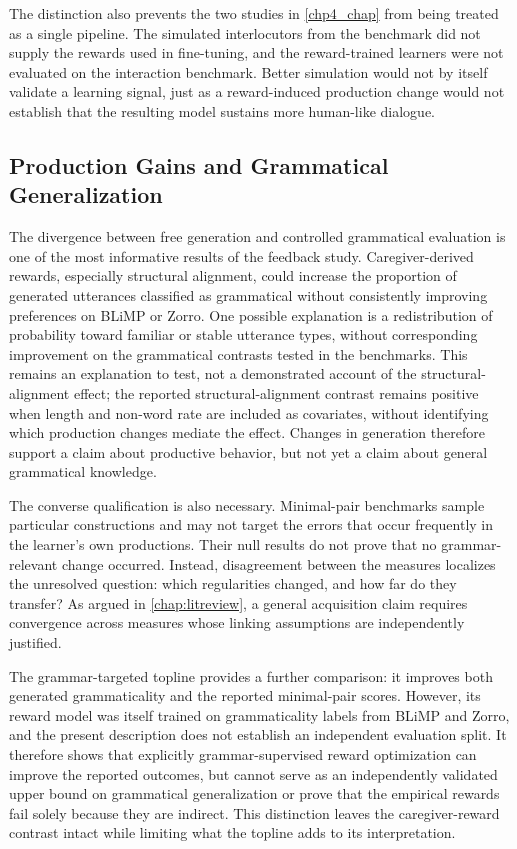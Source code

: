 The distinction also prevents the two studies in \cref{chp4_chap} from being treated as a single pipeline. The simulated interlocutors from the benchmark did not supply the rewards used in fine-tuning, and the reward-trained learners were not evaluated on the interaction benchmark. Better simulation would not by itself validate a learning signal, just as a reward-induced production change would not establish that the resulting model sustains more human-like dialogue.

\subsection{Production Gains and Grammatical Generalization}

The divergence between free generation and controlled grammatical evaluation is one of the most informative results of the feedback study. Caregiver-derived rewards, especially structural alignment, could increase the proportion of generated utterances classified as grammatical without consistently improving preferences on BLiMP or Zorro. One possible explanation is a redistribution of probability toward familiar or stable utterance types, without corresponding improvement on the grammatical contrasts tested in the benchmarks. This remains an explanation to test, not a demonstrated account of the structural-alignment effect; the reported structural-alignment contrast remains positive when length and non-word rate are included as covariates, without identifying which production changes mediate the effect. Changes in generation therefore support a claim about productive behavior, but not yet a claim about general grammatical knowledge.

The converse qualification is also necessary. Minimal-pair benchmarks sample particular constructions and may not target the errors that occur frequently in the learner's own productions. Their null results do not prove that no grammar-relevant change occurred. Instead, disagreement between the measures localizes the unresolved question: which regularities changed, and how far do they transfer? As argued in \cref{chap:litreview}, a general acquisition claim requires convergence across measures whose linking assumptions are independently justified.

The grammar-targeted topline provides a further comparison: it improves both generated grammaticality and the reported minimal-pair scores. However, its reward model was itself trained on grammaticality labels from BLiMP and Zorro, and the present description does not establish an independent evaluation split. It therefore shows that explicitly grammar-supervised reward optimization can improve the reported outcomes, but cannot serve as an independently validated upper bound on grammatical generalization or prove that the empirical rewards fail solely because they are indirect. This distinction leaves the caregiver-reward contrast intact while limiting what the topline adds to its interpretation.

